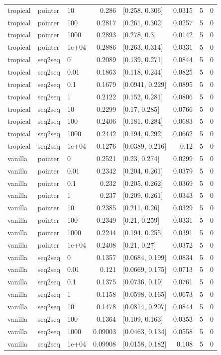 \documentclass[10pt]{article}
\begin{document}
{\begin{longtable}{lllrlrrr}
tropical & pointer & 10 & 0.286 & [0.258, 0.306] & 0.0315 & 5 & 0\\
tropical & pointer & 100 & 0.2817 & [0.261, 0.302] & 0.0257 & 5 & 0\\
tropical & pointer & 1000 & 0.2893 & [0.278, 0.3] & 0.0142 & 5 & 0\\
tropical & pointer & 1e+04 & 0.2886 & [0.263, 0.314] & 0.0331 & 5 & 0\\
tropical & seq2seq & 0 & 0.2089 & [0.139, 0.271] & 0.0844 & 5 & 0\\
tropical & seq2seq & 0.01 & 0.1863 & [0.118, 0.244] & 0.0825 & 5 & 0\\
tropical & seq2seq & 0.1 & 0.1679 & [0.0941, 0.229] & 0.0895 & 5 & 0\\
tropical & seq2seq & 1 & 0.2122 & [0.152, 0.281] & 0.0806 & 5 & 0\\
tropical & seq2seq & 10 & 0.2299 & [0.17, 0.285] & 0.0766 & 5 & 0\\
tropical & seq2seq & 100 & 0.2406 & [0.181, 0.284] & 0.0683 & 5 & 0\\
tropical & seq2seq & 1000 & 0.2442 & [0.194, 0.292] & 0.0662 & 5 & 0\\
tropical & seq2seq & 1e+04 & 0.1276 & [0.0389, 0.216] & 0.12 & 5 & 0\\
vanilla & pointer & 0 & 0.2521 & [0.23, 0.274] & 0.0299 & 5 & 0\\
vanilla & pointer & 0.01 & 0.2342 & [0.204, 0.261] & 0.0379 & 5 & 0\\
vanilla & pointer & 0.1 & 0.232 & [0.205, 0.262] & 0.0369 & 5 & 0\\
vanilla & pointer & 1 & 0.237 & [0.209, 0.261] & 0.0343 & 5 & 0\\
vanilla & pointer & 10 & 0.2385 & [0.211, 0.26] & 0.0329 & 5 & 0\\
vanilla & pointer & 100 & 0.2349 & [0.21, 0.259] & 0.0331 & 5 & 0\\
vanilla & pointer & 1000 & 0.2244 & [0.194, 0.255] & 0.0391 & 5 & 0\\
vanilla & pointer & 1e+04 & 0.2408 & [0.21, 0.27] & 0.0372 & 5 & 0\\
vanilla & seq2seq & 0 & 0.1357 & [0.0684, 0.199] & 0.0834 & 5 & 0\\
vanilla & seq2seq & 0.01 & 0.121 & [0.0669, 0.175] & 0.0713 & 5 & 0\\
vanilla & seq2seq & 0.1 & 0.1375 & [0.0736, 0.19] & 0.0761 & 5 & 0\\
vanilla & seq2seq & 1 & 0.1158 & [0.0598, 0.165] & 0.0673 & 5 & 0\\
vanilla & seq2seq & 10 & 0.1478 & [0.0814, 0.207] & 0.0844 & 5 & 0\\
vanilla & seq2seq & 100 & 0.1364 & [0.109, 0.163] & 0.0353 & 5 & 0\\
vanilla & seq2seq & 1000 & 0.09003 & [0.0463, 0.134] & 0.0558 & 5 & 0\\
vanilla & seq2seq & 1e+04 & 0.09908 & [0.0158, 0.182] & 0.108 & 5 & 0\\
\bottomrule
\end{longtable}
}
\end{document}

